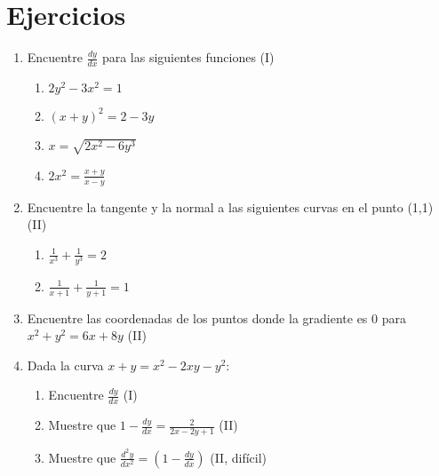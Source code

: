 \documentclass[spanish,12pt]{article}
\newcommand{\dydx}{\frac{dy}{dx}}
\begin{document}
\section{Ejercicios}
\begin{enumerate}[1)]
    \item Encuentre $\frac{dy}{dx}$ para las siguientes funciones (I)
    \begin{enumerate}
        \item $2y^2-3x^2=1$
        \item $(x+y)^2=2-3y$
        \item $x=\sqrt{2x^2-6y^3}$
        \item $2x^2=\frac{x+y}{x-y}$
    \end{enumerate}
    \item Encuentre la tangente y la normal a las siguientes curvas en el punto (1,1) (II)
    \begin{enumerate}
        \item $\frac{1}{x^3}+\frac{1}{y^3}=2$
        \item $\frac{1}{x+1}+\frac{1}{y+1}=1$
    \end{enumerate}
    \item Encuentre las coordenadas de los puntos donde la gradiente es 0 para $x^2+y^2=6x+8y$ (II)
    \item Dada la curva $x+y=x^2-2xy-y^2$:
    \begin{enumerate}
        \item Encuentre $\dydx$ (I)
        \item Muestre que $1-\dydx=\frac{2}{2x-2y+1}$ (II)
        \item Muestre que $\frac{d^2y}{dx^2}=\left(1-\dydx\right)$ (II, difícil)
    \end{enumerate}
\end{enumerate}
\end{document}
